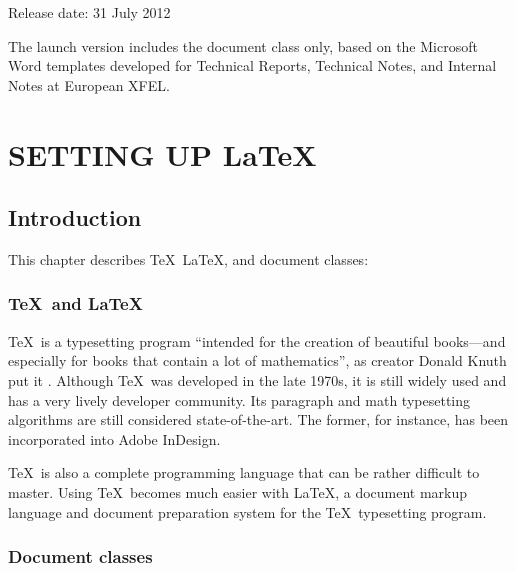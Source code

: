 \documentclass[]{xfel.eu-report}
\begin{document}

Release date: 31 July 2012

The launch version includes the  document class only, based on the Microsoft Word templates developed for Technical Reports, Technical Notes, and Internal Notes at European XFEL.
		
		
		
\part{SETTING UP \LaTeX}	

\chapter{Introduction}

This chapter describes \TeX\, \LaTeX, and document classes:
\linebreak
\startcontents


\section{\TeX\ and \LaTeX}

\TeX\ is a typesetting program ``intended for the
creation of beautiful books---and especially for books that contain a lot of
mathematics'', as creator Donald Knuth put it \cite[page v]{the-tex-book}. Although \TeX\ 
was developed in the late 1970s, it is still widely used and has a very lively
developer community. Its paragraph and math
typesetting algorithms are still considered state-of-the-art. The former,
for instance, has been incorporated into Adobe InDesign.

\TeX\ is also a complete programming language that can be rather difficult
to master. Using \TeX\ becomes much easier with \LaTeX, a document markup
language and document preparation system for the \TeX\ typesetting program.

\section{Document classes}
\end{document}
